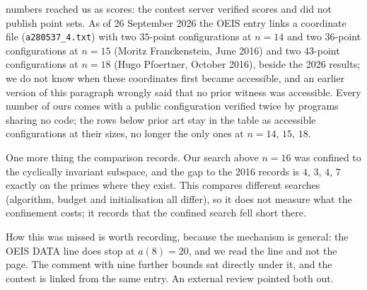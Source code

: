 \documentclass[11pt,a4paper]{article}
\begin{document}
numbers reached us as scores: the contest server verified scores and did not publish point sets.  As of
26 September 2026 the OEIS entry links a coordinate file (\texttt{a280537\_4.txt}) with two $35$-point
configurations at $n=14$ and two $36$-point configurations at $n=15$ (Moritz Franckenstein, June 2016) and two
$43$-point configurations at $n=18$ (Hugo Pfoertner, October 2016), beside the 2026 results; we do not know
when these coordinates first became accessible, and an earlier version of this paragraph wrongly said that no
prior witness was accessible.  Every number of ours comes with a public configuration verified twice by
programs sharing no code; the rows below prior art stay in the table as accessible configurations at their
sizes, no longer the only ones at $n=14$, $15$, $18$.

One more thing the comparison records.  Our search above $n=16$ was confined to the cyclically
invariant subspace, and the gap to the 2016 records is $4$, $3$, $4$, $7$ exactly on the primes where
they exist.  This compares different searches (algorithm, budget and initialisation all differ), so it
does not measure what the confinement costs; it records that the confined search fell short there.

How this was missed is worth recording, because the mechanism is general: the OEIS DATA line
does stop at $a(8)=20$, and we read the line and not the page.  The comment with nine further
bounds sat directly under it, and the contest is linked from the same entry.  An external
review pointed both out.
\end{document}
